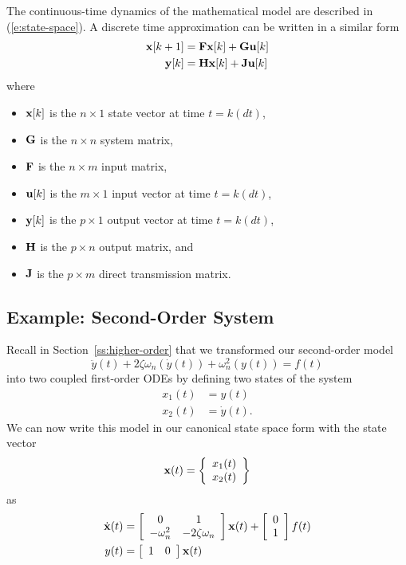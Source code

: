 The continuous-time dynamics of the mathematical model are described in (\ref{e:state-space}).  A discrete time approximation can be written in a similar form
\begin{align}
\label{e:state-spaced}
\mbox{${\bf x}$}[k+1] & = \mbox{${\bf F}$} \mbox{${\bf x}$}[k] + \mbox{${\bf G}$}\mbox{${\bf u}$}[k] \nonumber \\
\mbox{${\bf y}$}[k] & = \mbox{${\bf H}$}\mbox{${\bf x}$}[k] + \mbox{${\bf J}$}\mbox{${\bf u}$}[k]
\end{align}
where
\begin{itemize}
\item $\mbox{${\bf x}$}[k]$ is the $n \times 1$ state vector at time $t=k(dt)$,
\item $\mbox{${\bf G}$}$ is the $n \times n$ system matrix,
\item $\mbox{${\bf F}$}$ is the $n \times m$ input matrix,
\item $\mbox{${\bf u}$}[k]$ is the $m \times 1$ input vector at time $t=k(dt)$,
\item $\mbox{${\bf y}$}[k]$ is the $p \times 1$ output vector at time $t=k(dt)$,
\item $\mbox{${\bf H}$}$ is the $p \times n$ output matrix, and
\item $\mbox{${\bf J}$}$ is the $p \times m$ direct transmission matrix.
\end{itemize}

\subsection{Example: Second-Order System}
Recall in Section~\ref{ss:higher-order} that we transformed our second-order model 
\begin{equation}\label{e:2ndagain}
\ddot{y}(t) + 2 \zeta \omega_n (\dot{y}(t)) + \omega_n^2 (y(t)) = f(t)
\end{equation}
into two coupled first-order ODEs by defining two states of the system
\begin{align}\label{e:2states}
x_1(t) & = y(t) \nonumber \\
x_2(t) & = \dot{y}(t).
\end{align}
We can now write this model in our canonical state space form with the state vector
\[
\mbox{${\bf x}$}(t)  =  \left\{ \begin{array}{c}
x_1(t) \\
x_2(t) 
\end{array} \right\}
\]
as 
\begin{align}\label{e:state-space-2d}
\dot{\mbox{${\bf x}$}}(t) & = \left[ \begin{array}{cc}
0 & 1 \\
-\omega_n^2 & -2 \zeta \omega_n  
\end{array} \right] \mbox{${\bf x}$}(t) + 
\left[ \begin{array}{c}
0 \\
1
\end{array}\right]
f(t) \nonumber \\
y(t) & = \left[ \begin{array}{cc} 1 & 0 \end{array} \right] \mbox{${\bf x}$}(t)
\end{align}

